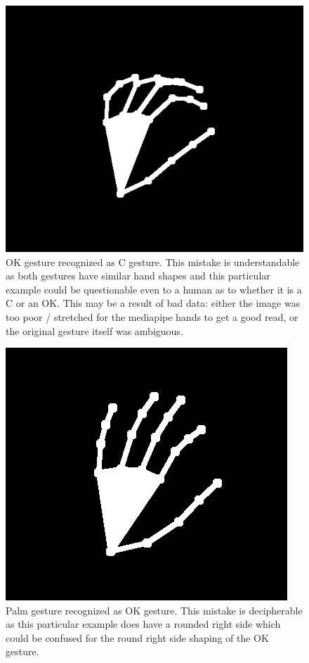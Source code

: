 \documentclass{article}
\begin{document}
\begin{figure}
  \centering
  \includegraphics[width=\linewidth]{input1.png}
  \caption*{OK gesture recognized as C gesture. This mistake
  is understandable as both gestures have similar hand shapes and this
  particular example could be questionable even to a human as to whether it is a C or an OK.
  This may be a result of bad data: either the image was too poor / stretched for the mediapipe
  hands to get a good read, or the original gesture itself was ambiguous.}
\end{figure}

\begin{figure}
  \centering
  \includegraphics[width=\linewidth]{input2.png}
  \caption*{Palm gesture recognized as OK gesture. This mistake is decipherable as
  this particular example does have a rounded right side which could be confused for the round
  right side shaping of the OK gesture.}
\end{figure}
\end{document}
